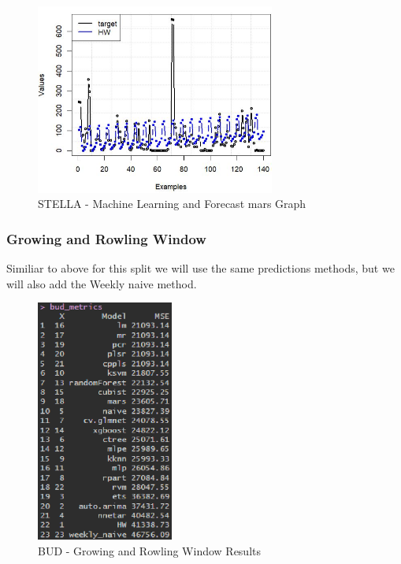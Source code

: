 \begin{figure}[H]
    \centering
    \includegraphics[width=0.7\textwidth]{assets/stella-split-graph.jpeg}
    \caption{STELLA - Machine Learning and Forecast mars Graph}
    \label{fig:mulivariate_dataset}
    \end{figure}


\newpage
\subsubsection{Growing and Rowling Window}

Similiar to above for this split we will use the same predictions methods, but we will also add the Weekly naive method.\\



\begin{figure}[H]
    \centering
    \includegraphics[width=0.4\textwidth]{assets/bud-gw.png}
    \caption{BUD - Growing and Rowling Window Results}
    \label{fig:gw_bud}
    \end{figure}

